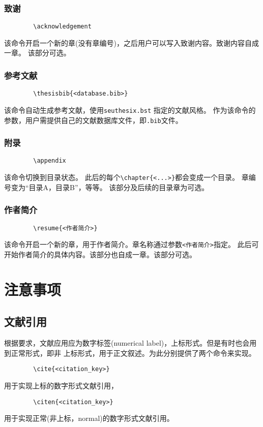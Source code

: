 \documentclass[figurelist,tablelist,algorithmlist,nomlist,masters]{seuthesix}
\begin{document}
	\subsection{致谢}
	{\color{magenta}
		\begin{verbatim}
		\acknowledgement
		\end{verbatim}
	}
	该命令开启一个新的章(没有章编号)，之后用户可以写入致谢内容。致谢内容自成一章。
	该部分可选。
	\subsection{参考文献}
	{\color{magenta}
		\begin{verbatim}
		\thesisbib{<database.bib>}
		\end{verbatim}
	}
	该命令自动生成参考文献，使用\texttt{seuthesix.bst} 指定的文献风格。
	作为该命令的参数，用户需提供自己的文献数据库文件，即\texttt{.bib}文件。
	
	\subsection{附录}
	{\color{magenta}
		\begin{verbatim}
		\appendix
		\end{verbatim}
	}
	该命令切换到目录状态。
	此后的每个\verb+\chapter{<...>}+都会变成一个目录。
	章编号变为“目录A，目录B”，等等。
	该部分及后续的目录章为可选。
	\subsection{作者简介}
	{\color{magenta}
		\begin{verbatim}
		\resume{<作者简介>}
		\end{verbatim}
	}
	该命令开启一个新的章，用于作者简介。章名称通过参数\texttt{<作者简介>}指定。
	此后可开始作者简介的具体内容。该部分也自成一章。该部分可选。
	
	
	\chapter{注意事项}
	\section{文献引用}
	根据要求，文献应用应为数字标签(numerical label)，上标形式。但是有时也会用到正常形式，即非
	上标形式，用于正文叙述。为此分别提供了两个命令来实现。
	{\color{magenta}
		\begin{verbatim}
		\cite{<citation_key>}
		\end{verbatim}
	}
	用于实现上标的数字形式文献引用\cite{knuth}，
	{\color{magenta}
		\begin{verbatim}
		\citen{<citation_key>}
		\end{verbatim}
	}
	用于实现正常(非上标，normal)的数字形式文献引用。
\end{document}
